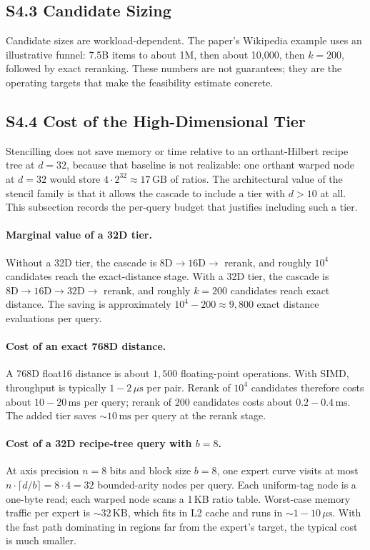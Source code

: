 \documentclass[11pt]{article}
\begin{document}
\subsection*{S4.3 Candidate Sizing}
Candidate sizes are workload-dependent. The paper's Wikipedia example uses an illustrative funnel: 7.5B items to about 1M, then about 10,000, then $k=200$, followed by exact reranking. These numbers are not guarantees; they are the operating targets that make the feasibility estimate concrete.

\subsection*{S4.4 Cost of the High-Dimensional Tier}
\label{sec:si-cascade-cost}
Stencilling does not save memory or time relative to an orthant-Hilbert recipe tree at $d=32$, because that baseline is not realizable: one orthant warped node at $d=32$ would store $4\cdot 2^{32}\approx 17\,\mathrm{GB}$ of ratios. The architectural value of the stencil family is that it allows the cascade to include a tier with $d>10$ at all. This subsection records the per-query budget that justifies including such a tier.

\paragraph{Marginal value of a 32D tier.}
Without a 32D tier, the cascade is $8\mathrm{D}\to16\mathrm{D}\to$ rerank, and roughly $10^4$ candidates reach the exact-distance stage. With a 32D tier, the cascade is $8\mathrm{D}\to16\mathrm{D}\to32\mathrm{D}\to$ rerank, and roughly $k=200$ candidates reach exact distance. The saving is approximately $10^4-200\approx 9{,}800$ exact distance evaluations per query.

\paragraph{Cost of an exact 768D distance.}
A 768D float16 distance is about $1{,}500$ floating-point operations. With SIMD, throughput is typically $1{-}2\,\mu\mathrm{s}$ per pair. Rerank of $10^4$ candidates therefore costs about $10{-}20\,\mathrm{ms}$ per query; rerank of $200$ candidates costs about $0.2{-}0.4\,\mathrm{ms}$. The added tier saves $\sim 10\,\mathrm{ms}$ per query at the rerank stage.

\paragraph{Cost of a 32D recipe-tree query with $b=8$.}
At axis precision $n=8$ bits and block size $b=8$, one expert curve visits at most $n\cdot\lceil d/b\rceil=8\cdot 4=32$ bounded-arity nodes per query. Each uniform-tag node is a one-byte read; each warped node scans a 1\,KB ratio table. Worst-case memory traffic per expert is $\sim 32\,\mathrm{KB}$, which fits in L2 cache and runs in $\sim 1{-}10\,\mu\mathrm{s}$. With the fast path dominating in regions far from the expert's target, the typical cost is much smaller.
\end{document}
